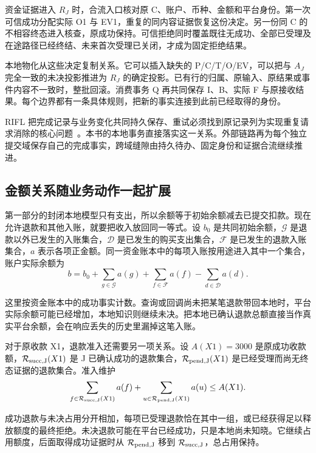 资金证据进入 $R_J$ 时，合流入口核对原 C、账户、币种、金额和平台身份。第一次可信成功分配实际 O1 与 EV1，重复的同内容证据恢复这份决定。另一份同 C 的不相容终态进入核查，原成功保持。可信拒绝同时覆盖既往无成功、全部已受理及在途路径已经终结、未来首次受理已关闭，才成为固定拒绝结果。

本地物化从这些决定复制关系。它可以插入缺失的 P/C/T/O/EV，可以把与 $A_J$ 完全一致的未决投影推进为 $R_J$ 的确定投影。已有行的归属、原输入、原结果或事件内容不一致时，整批回滚。消费事务 Q 再共同保存 I、B、实际 F 与原接收结果。每个边界都有一条具体规则，把新的事实连接到此前已经取得的身份。


RIFL 把完成记录与业务变化共同持久保存、重试必须找到原记录列为实现重复请求消除的核心问题~\cite{rifl}。本书的本地事务直接落实这一关系。外部链路再为每个独立提交域保存自己的完成事实，跨域缝隙由持久待办、固定身份和证据合流继续推进。

\subsection*{金额关系随业务动作一起扩展}

第一部分的封闭本地模型只有支出，所以余额等于初始余额减去已提交扣款。现在允许退款和其他入账，就要把收入放回同一等式。设 $b_0$ 是共同初始余额，$\mathcal G$ 是退款以外已发生的入账集合，$\mathcal D$ 是已发生的购买支出集合，$\mathcal F$ 是已发生的退款入账集合，$a$ 表示各项正金额。同一资金账本中的每项入账按用途进入其中一个集合，账户实际余额为
\[
b=b_0+\sum_{g\in\mathcal G}a(g)
       +\sum_{f\in\mathcal F}a(f)
       -\sum_{d\in\mathcal D}a(d).
\]

这里按资金账本中的成功事实计数。查询或回调尚未把某笔退款带回本地时，平台实际余额可能已经增加，本地知识则继续未决。把本地已确认退款总额直接当作真实平台余额，会在响应丢失的历史里漏掉这笔入账。

对于原收款 X1，退款准入还需要另一项关系。设 $A(X1)=3000$ 是原成功收款额，$\mathcal R_{\rm succ,J}(X1)$ 是 J 已确认成功的退款集合，$\mathcal R_{\rm pend,J}(X1)$ 是已经受理而尚无终态证据的退款集合。准入维护
\[
\sum_{f\in\mathcal R_{\rm succ,J}(X1)}a(f)
+\sum_{u\in\mathcal R_{\rm pend,J}(X1)}a(u)
\le A(X1).
\]

成功退款与未决占用分开相加，每项已受理退款恰在其中一组，或已经获得足以释放额度的最终拒绝。未决退款可能在平台已经成功，只是本地尚未知晓。它继续占用额度，后面取得成功证据时从 $\mathcal R_{\rm pend,J}$ 移到 $\mathcal R_{\rm succ,J}$，总占用保持。

